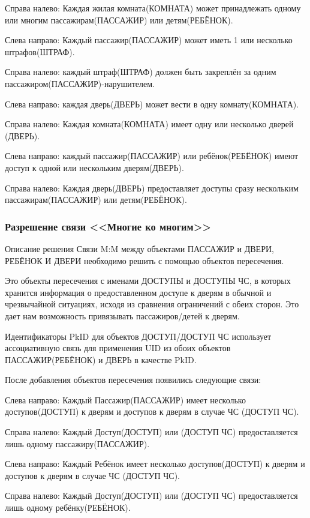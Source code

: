 Справа налево: Каждая жилая комната(КОМНАТА) может принадлежать одному или многим пассажирам(ПАССАЖИР) или детям(РЕБЁНОК).

Слева направо: Каждый пассажир(ПАССАЖИР) может иметь 1 или несколько штрафов(ШТРАФ).

Справа налево: каждый штраф(ШТРАФ) должен быть закреплён за одним пассажиром(ПАССАЖИР)-нарушителем.

Слева направо: каждая дверь(ДВЕРЬ) может вести в одну комнату(КОМНАТА).

Справа налево: Каждая комната(КОМНАТА) имеет одну или несколько дверей (ДВЕРЬ).

Слева направо: каждый пассажир(ПАССАЖИР) или ребёнок(РЕБЁНОК) имеют доступ к одной или нескольким дверям(ДВЕРЬ).

Справа налево: Каждая дверь(ДВЕРЬ) предоставляет доступы сразу нескольким пассажирам(ПАССАЖИР) или детям(РЕБЁНОК).

\subsubsection{Разрешение связи <<Многие ко многим>>}

Описание решения Связи M:M между объектами ПАССАЖИР и ДВЕРИ, РЕБЁНОК И ДВЕРИ необходимо решить с помощью объектов пересечения. 

Это объекты пересечения с именами ДОСТУПЫ и ДОСТУПЫ ЧС, в которых хранится информация о предоставленном доступе к дверям в обычной и чрезвычайной ситуациях, исходя из сравнения ограничений с обеих сторон. Это дает нам возможность привязывать пассажиров/детей к дверям.
 
Идентификаторы PkID для объектов ДОСТУП/ДОСТУП ЧС использует ассоциативную связь для применения UID из обоих объектов ПАССАЖИР(РЕБЁНОК) и ДВЕРЬ в качестве PkID.

После добавления объектов пересечения появились следующие связи:

Слева направо: Каждый Пассажир(ПАССАЖИР) имеет несколько доступов(ДОСТУП) к дверям и доступов к дверям в случае ЧС (ДОСТУП ЧС).

Справа налево: Каждый Доступ(ДОСТУП) или (ДОСТУП ЧС) предоставляется лишь одному пассажиру(ПАССАЖИР).

Слева направо: Каждый Ребёнок имеет несколько доступов(ДОСТУП) к дверям и доступов к дверям в случае ЧС (ДОСТУП ЧС).

Справа налево: Каждый Доступ(ДОСТУП) или (ДОСТУП ЧС) предоставляется лишь одному ребёнку(РЕБЁНОК).

